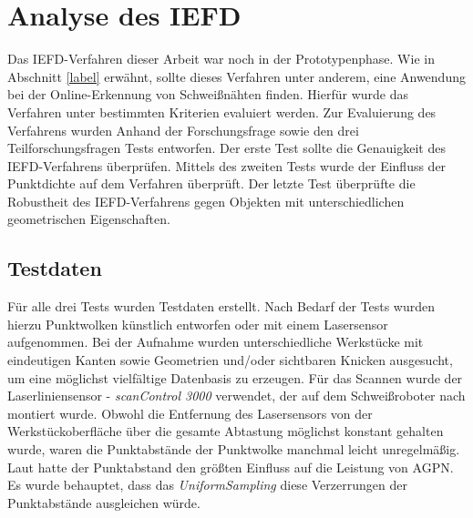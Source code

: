 \chapter{Analyse des IEFD}
Das IEFD-Verfahren dieser Arbeit war noch in der Prototypenphase. Wie in Abschnitt \ref{label} erwähnt, sollte dieses Verfahren unter anderem, eine Anwendung bei der Online-Erkennung von Schweißnähten finden. Hierfür wurde das Verfahren unter bestimmten Kriterien evaluiert werden. Zur Evaluierung des Verfahrens wurden Anhand der Forschungsfrage sowie den drei Teilforschungsfragen Tests entworfen. Der erste Test sollte die Genauigkeit des IEFD-Verfahrens überprüfen. Mittels des zweiten Tests wurde der Einfluss der Punktdichte auf dem Verfahren überprüft. Der letzte Test überprüfte die Robustheit des IEFD-Verfahrens gegen Objekten mit unterschiedlichen geometrischen Eigenschaften.

\section{Testdaten}
Für alle drei Tests wurden Testdaten erstellt. Nach Bedarf der Tests wurden hierzu Punktwolken künstlich entworfen oder mit einem Lasersensor aufgenommen. Bei der Aufnahme wurden unterschiedliche Werkstücke mit eindeutigen Kanten sowie Geometrien und/oder sichtbaren Knicken ausgesucht, um eine möglichst vielfältige Datenbasis zu erzeugen. Für das Scannen wurde der Laserliniensensor - \textit{scanControl 3000} verwendet, der auf dem Schweißroboter nach \textcite[39]{savla_intelligente_2022} montiert wurde. Obwohl die Entfernung des Lasersensors von der Werkstückoberfläche über die gesamte Abtastung möglichst konstant gehalten wurde, waren die Punktabstände der Punktwolke manchmal leicht unregelmäßig. Laut \textcite[9]{ni_edge_2016} hatte der Punktabstand den größten Einfluss auf die Leistung von AGPN. Es wurde behauptet, dass das \textit{UniformSampling} diese Verzerrungen der Punktabstände ausgleichen würde. 

